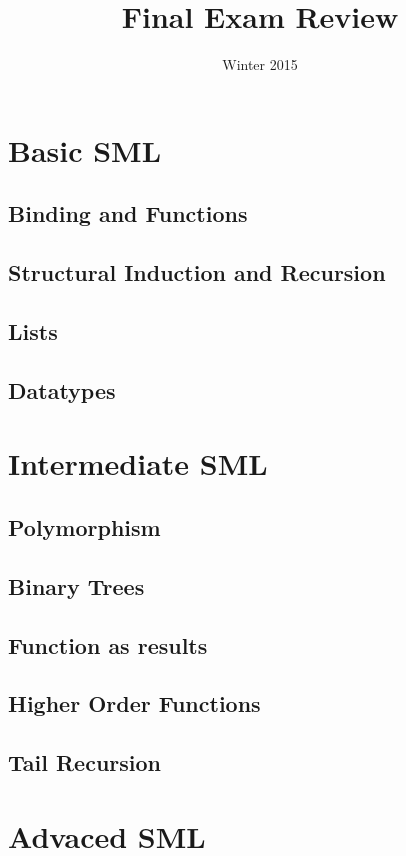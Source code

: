 \documentclass[10pt,twoside]{article}
\title{\textbf{\doctitle}\\
Final Exam Review}
\date{Winter 2015}
\begin{document}
\thispagestyle{empty}

\maketitle

\section{Basic SML}
\subsection{Binding and Functions}
\subsection{Structural Induction and Recursion}
\subsection{Lists}
\subsection{Datatypes}

\section{Intermediate SML}
\subsection{Polymorphism}
\subsection{Binary Trees}
\subsection{Function as results}
\subsection{Higher Order Functions}
\subsection{Tail Recursion}


\section{Advaced SML}
\end{document}
